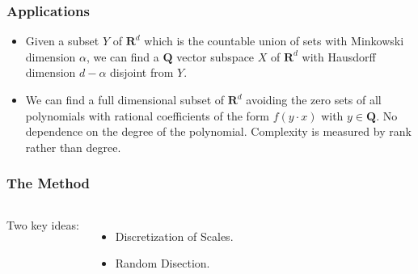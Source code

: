 \documentclass[usenames,dvipsnames]{beamer}
\begin{document}
\begin{frame}
    \frametitle{Applications}

    \begin{itemize}
        \item Given a subset $Y$ of $\mathbf{R}^d$ which is the countable union of sets with Minkowski dimension $\alpha$, we can find a $\mathbf{Q}$ vector subspace $X$ of $\mathbf{R}^d$ with Hausdorff dimension $d - \alpha$ disjoint from $Y$.

        \pause
        \item We can find a full dimensional subset of $\mathbf{R}^d$ avoiding the zero sets of all polynomials with rational coefficients of the form $f(y \cdot x)$ with $y \in \mathbf{Q}$. No dependence on the degree of the polynomial. Complexity is measured by rank rather than degree.

    \end{itemize}
\end{frame}

\begin{frame}
    \frametitle{The Method}

    \begin{columns}


    {\Huge Two key ideas: }
    \pause

     \begin{itemize}
        \item {\Large Discretization of Scales.}
        \pause

        \item {\Large Random Disection.}
     \end{itemize}

     \end{columns}
\end{frame}

\end{document}
